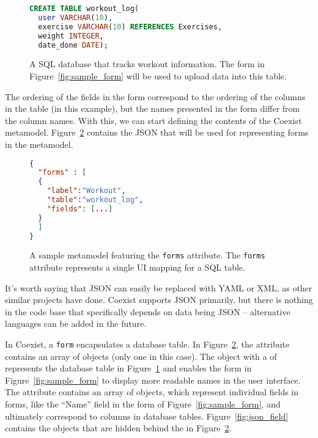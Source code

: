 \begin{figure}[h!]
\begin{lstlisting}[language=sql]
CREATE TABLE workout_log(
  user VARCHAR(10),
  exercise VARCHAR(10) REFERENCES Exercises,
  weight INTEGER,
  date_done DATE);
\end{lstlisting}
\caption{A SQL database that tracks workout information. The form in
Figure~\ref{fig:sample_form} will be used to upload data into this table.}
\label{fig:sample_table}
\end{figure}

The ordering of the fields in the form correspond to the ordering of the columns
in the table (in this example), but the names presented in the form differ from
the column names. With this, we can start defining the contents of the Coexist
metamodel. Figure~\ref{fig:json_form} contains the JSON that will be used for
representing forms in the metamodel.

\begin{figure}[h!]
\begin{lstlisting}[language=json]
{
  "forms" : [
  {
    "label":"Workout",
    "table":"workout_log",
    "fields": [...]
  }
  ]
}
\end{lstlisting}
\caption{A sample metamodel featuring the \texttt{forms} attribute. The
\texttt{forms} attribute represents a single UI mapping for a SQL table.}
\label{fig:json_form}
\end{figure}

It's worth saying that JSON can easily be replaced with YAML or XML, as other
similar projects have done\cite{giulieri_minimalist_2011}. Coexist supports JSON
primarily, but there is nothing in the code base that specifically depends on
data being JSON -- alternative languages can be added in the future.

In Coexist, a \texttt{form} encapsulates a database table. In
Figure~\ref{fig:json_form}, the  attribute contains an array of
 objects (only one in this case). The  object with a
 of  represents the database table in
Figure~\ref{fig:sample_table} and enables the form in
Figure~\ref{fig:sample_form} to display more readable names in the user
interface. The  attribute contains an array of  objects,
which represent individual fields in forms, like the ``Name'' field in the form
of Figure~\ref{fig:sample_form}, and ultimately correspond to columns in
database tables. Figure~\ref{fig:json_field} contains the  objects that
are hidden behind the \var{\ldots} in Figure~\ref{fig:json_form}.


